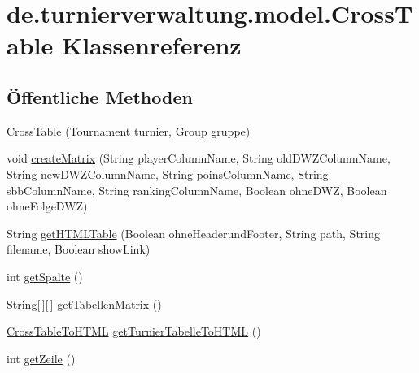 \hypertarget{classde_1_1turnierverwaltung_1_1model_1_1_cross_table}{}\section{de.\+turnierverwaltung.\+model.\+Cross\+Table Klassenreferenz}
\label{classde_1_1turnierverwaltung_1_1model_1_1_cross_table}
\subsection*{Öffentliche Methoden}
\begin{DoxyCompactItemize}
\item 
\hyperlink{classde_1_1turnierverwaltung_1_1model_1_1_cross_table_a16166b8e69e94b2e59f6e15e7148b1b2}{Cross\+Table} (\hyperlink{classde_1_1turnierverwaltung_1_1model_1_1_tournament}{Tournament} turnier, \hyperlink{classde_1_1turnierverwaltung_1_1model_1_1_group}{Group} gruppe)
\item 
void \hyperlink{classde_1_1turnierverwaltung_1_1model_1_1_cross_table_ac6194d8357b8cc450397f1fc6f1cdccc}{create\+Matrix} (String player\+Column\+Name, String old\+D\+W\+Z\+Column\+Name, String new\+D\+W\+Z\+Column\+Name, String poins\+Column\+Name, String sbb\+Column\+Name, String ranking\+Column\+Name, Boolean ohne\+D\+WZ, Boolean ohne\+Folge\+D\+WZ)
\item 
String \hyperlink{classde_1_1turnierverwaltung_1_1model_1_1_cross_table_a9393b86fc70d8126eac4b78c6486bf61}{get\+H\+T\+M\+L\+Table} (Boolean ohne\+Headerund\+Footer, String path, String filename, Boolean show\+Link)
\item 
int \hyperlink{classde_1_1turnierverwaltung_1_1model_1_1_cross_table_ad619ed89d7ee2b05dfeca8849810f95e}{get\+Spalte} ()
\item 
String\mbox{[}$\,$\mbox{]}\mbox{[}$\,$\mbox{]} \hyperlink{classde_1_1turnierverwaltung_1_1model_1_1_cross_table_a79281a275bcde759f199465c561e65c7}{get\+Tabellen\+Matrix} ()
\item 
\hyperlink{classde_1_1turnierverwaltung_1_1model_1_1_cross_table_to_h_t_m_l}{Cross\+Table\+To\+H\+T\+ML} \hyperlink{classde_1_1turnierverwaltung_1_1model_1_1_cross_table_ad96017e789434ae957ca6c91d97cfbbc}{get\+Turnier\+Tabelle\+To\+H\+T\+ML} ()
\item 
int \hyperlink{classde_1_1turnierverwaltung_1_1model_1_1_cross_table_ae45842e506e8f5dace6aa7886f836a9a}{get\+Zeile} ()
\item 

\end{DoxyCompactItemize}
